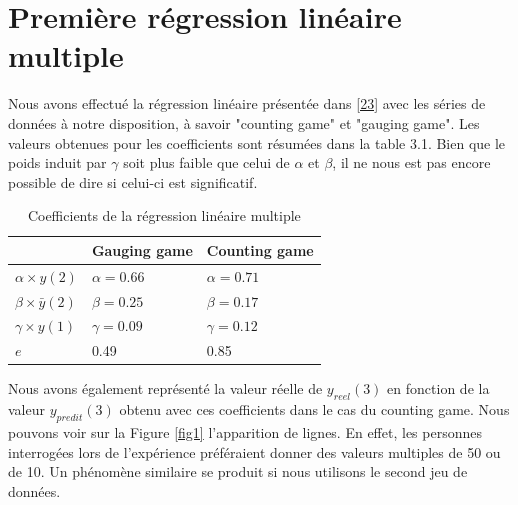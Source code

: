 \documentclass{scrreprt}
\begin{document}
\section{Première régression linéaire multiple}

Nous avons effectué la régression linéaire présentée dans \eqref{23} avec les  séries de données à notre disposition, à savoir "counting game" et "gauging game". Les valeurs obtenues pour les coefficients sont résumées dans la table 3.1. Bien que le poids induit par $\gamma$ soit plus faible que celui de $\alpha$ et $\beta$, il ne nous est pas encore possible de dire si celui-ci est significatif. \\

\begin{table}
	\begin{tabular}{|p{4cm}|p{4.5cm}|p{4.5cm}|}
		\hline
 & Gauging game & Counting game \tabularnewline
		\hline
$\alpha \times y(2)$ & $\alpha =  0.66$ & $\alpha = 0.71$ \tabularnewline
		\hline
$\beta \times \bar{y}(2)$ & $\beta = 0.25$ & $\beta =0.17$ \tabularnewline
		\hline
$\gamma \times y(1)$ & $\gamma = 0.09$  & $\gamma = 0.12$ \tabularnewline
		\hline
$e$ &  0.49 & 0.85 \tabularnewline
		\hline
	\end{tabular}
	\caption{Coefficients de la régression linéaire multiple}
\end{table}

 

Nous avons également représenté la valeur réelle de $y_{reel}(3)$ en fonction de la valeur $y_{predit}(3)$ obtenu avec ces coefficients dans le cas du counting game. Nous pouvons voir sur la Figure \ref{fig1} l'apparition de lignes. En effet, les personnes interrogées lors de l'expérience préféraient donner des valeurs multiples de 50 ou de 10. Un phénomène similaire se produit si nous utilisons le second jeu de données.\\

  
\end{document}
